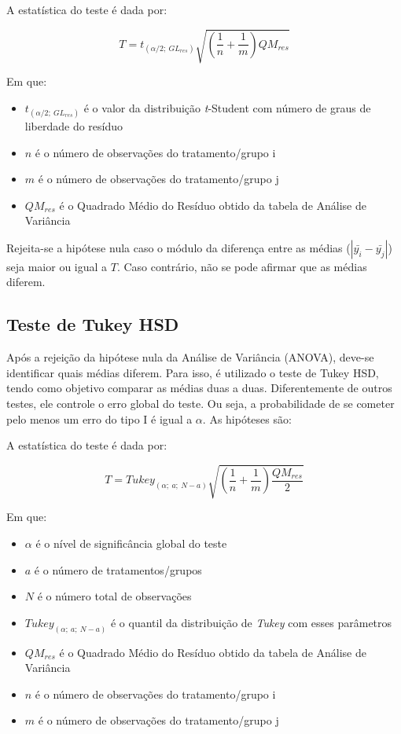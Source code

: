 \documentclass[
]{estat/estat}
\providecommand{\tightlist}{%
  \setlength{\itemsep}{0pt}\setlength{\parskip}{0pt}}\usepackage{longtable,booktabs,array}
\begin{document}

A estatística do teste é dada por:

\[T = t_{(\alpha/2; \: GL_{res})}\sqrt{\left(\frac{1}{n}+\frac{1}{m}\right)QM_{res}}\]

Em que:

\begin{itemize}
\item
  \(t_{(\alpha/2; \: GL_{res})}\) é o valor da distribuição
  \textit{t}-Student com número de graus de liberdade do resíduo
\item
  \(n\) é o número de observações do tratamento/grupo i
\item
  \(m\) é o número de observações do tratamento/grupo j
\item
  \(QM_{res}\) é o Quadrado Médio do Resíduo obtido da tabela de Análise
  de Variância
\end{itemize}

Rejeita-se a hipótese nula caso o módulo da diferença entre as médias
(\(|\bar{y_i} - \bar{y_j}|\)) seja maior ou igual a \(T\). Caso
contrário, não se pode afirmar que as médias diferem.

\subsection{Teste de Tukey HSD}\label{teste-de-tukey-hsd}

Após a rejeição da hipótese nula da Análise de Variância (ANOVA),
deve-se identificar quais médias diferem. Para isso, é utilizado o teste
de Tukey HSD, tendo como objetivo comparar as médias duas a duas.
Diferentemente de outros testes, ele controle o erro global do teste. Ou
seja, a probabilidade de se cometer pelo menos um erro do tipo I é igual
a \(\alpha\). As hipóteses são:


A estatística do teste é dada por:

\[T = Tukey_{(\alpha; \: a; \: N-a)}\sqrt{\left(\frac{1}{n}+\frac{1}{m}\right)\frac{QM_{res}}{2}}\]

Em que:

\begin{itemize}
\tightlist
\item
  \(\alpha\) é o nível de significância global do teste
\item
  \(a\) é o número de tratamentos/grupos
\item
  \(N\) é o número total de observações
\item
  \(Tukey_{(\alpha; \: a; \: N-a)}\) é o quantil da distribuição de
  \textit{Tukey} com esses parâmetros
\item
  \(QM_{res}\) é o Quadrado Médio do Resíduo obtido da tabela de Análise
  de Variância
\item
  \(n\) é o número de observações do tratamento/grupo i
\item
  \(m\) é o número de observações do tratamento/grupo j
\end{itemize}
\end{document}
